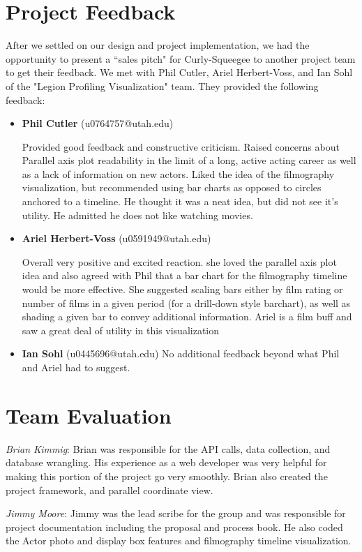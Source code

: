 \documentclass[12pt]{article}
\begin{document}
\newpage

\section{Project Feedback}

After we settled on our design and project implementation, we had the opportunity to present a ``sales pitch"  for Curly-Squeegee to another project team to get their feedback.  We met with Phil Cutler, Ariel Herbert-Voss, and Ian Sohl of the "Legion Profiling Visualization" team. They provided the following feedback:

\begin{itemize}
	\item \textbf{Phil Cutler} (u0764757@utah.edu)
	
	Provided good feedback and constructive criticism. Raised concerns about Parallel axis plot readability in the limit of a long, active acting career as well as a lack of information on new actors. Liked the idea of the filmography visualization, but recommended using bar charts as opposed to circles anchored to a timeline. He thought it was a neat idea, but did not see it's utility. He admitted he does not like watching movies.
	
	
	\item \textbf{Ariel Herbert-Voss} (u0591949@utah.edu)
	
	Overall very positive and excited reaction. she loved the parallel axis plot idea and also agreed with Phil that a bar chart for the filmography timeline would be more effective. She suggested scaling bars either by film rating or number of films in a given period (for a drill-down style barchart), as well as shading a given bar to convey additional information. Ariel is a film buff and saw a great deal of utility in this visualization
	
	\item \textbf{Ian Sohl} (u0445696@utah.edu)
		No additional feedback beyond what Phil and Ariel had to suggest.
\end{itemize}

\newpage

\section{Team Evaluation}

\textit{Brian Kimmig}: Brian was responsible for the API calls, data collection, and database wrangling. His experience as a web developer was very helpful for making this portion of the project go very smoothly. Brian also created the project framework, and parallel coordinate view.

\textit{Jimmy Moore}: Jimmy was the lead scribe for the group and was responsible for project documentation including the proposal and process book. He also coded the Actor photo and display box features and filmography timeline visualization.
\end{document}
